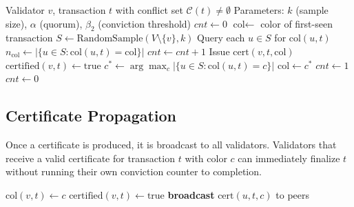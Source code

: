 \documentclass[11pt,a4paper]{article}
\begin{document}
\begin{algorithm}[H]
\caption{Flare Protocol --- Conviction-Based Certification}
\label{alg:flare-core}
\begin{algorithmic}[1]
\Require Validator $v$, transaction $t$ with conflict set $\mathcal{C}(t) \neq \emptyset$
\Require Parameters: $k$ (sample size), $\alpha$ (quorum), $\beta_2$ (conviction threshold)
\State $cnt \gets 0$
\State $\text{col} \gets$ color of first-seen transaction
    \State $S \gets \text{RandomSample}(V \setminus \{v\}, k)$
    \State Query each $u \in S$ for $\text{col}(u, t)$
    \State $n_{\text{col}} \gets |\{u \in S : \text{col}(u, t) = \text{col}\}|$
        \State $cnt \gets cnt + 1$ 
            \State Issue $\text{cert}(v, t, \text{col})$
            \State $\text{certified}(v, t) \gets \text{true}$
        \EndIf
    \Else
        \State $c^* \gets \arg\max_c |\{u \in S : \text{col}(u, t) = c\}|$
            \State $\text{col} \gets c^*$ 
            \State $cnt \gets 1$ 
        \Else
            \State $cnt \gets 0$ 
        \EndIf
    \EndIf
\EndWhile
\end{algorithmic}
\end{algorithm}

\subsection{Certificate Propagation}

Once a certificate is produced, it is broadcast to all validators. Validators that
receive a valid certificate for transaction $t$ with color $c$ can immediately finalize
$t$ without running their own conviction counter to completion.

\begin{algorithm}[H]
\caption{Flare Certificate Verification and Adoption}
\label{alg:flare-cert}
\begin{algorithmic}[1]
        \State $\text{col}(v, t) \gets c$
        \State $\text{certified}(v, t) \gets \text{true}$
        \State \textbf{broadcast} $\text{cert}(u, t, c)$ to peers
    \EndIf
\EndFunction
\end{algorithmic}
\end{algorithm}
\end{document}
